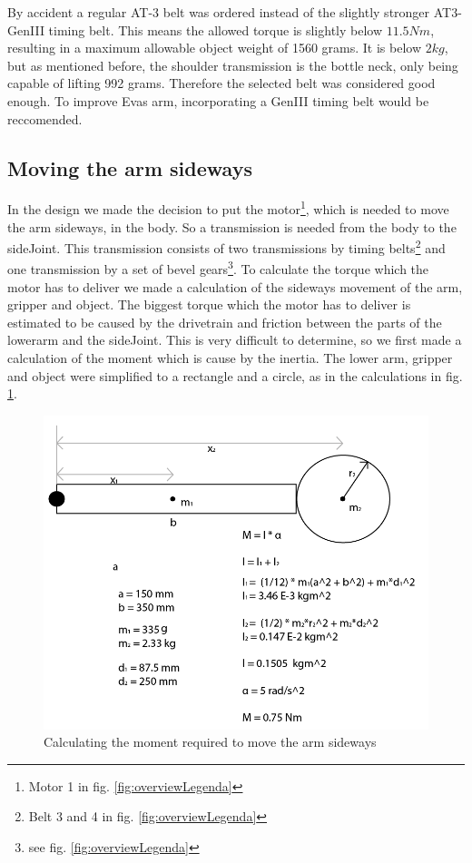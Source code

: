\documentclass[technical_document.tex]{subfiles}
\begin{document}
By accident a regular AT-3 belt was ordered instead of the slightly stronger AT3-GenIII timing belt. This means the allowed torque is slightly below $11.5Nm$, resulting in a maximum allowable object weight  of 1560 grams. It is below $2kg$, but as mentioned before, the shoulder transmission is the bottle neck, only being capable of lifting 992 grams.
Therefore the selected belt was considered good enough. To improve Eva\textquotesingle{}s arm, incorporating a GenIII timing belt would be reccomended.

\subsection{Moving the arm sideways}

In the design we made the decision to put the motor\footnote{Motor 1 in fig. \ref{fig:overviewLegenda}}, which is needed to move the arm sideways, in the body. So a transmission is needed from the body to the sideJoint. This transmission consists of two transmissions by timing belts\footnote{Belt 3 and 4 in fig. \ref{fig:overviewLegenda}} and one transmission by a set of bevel gears\footnote{see fig. \ref{fig:overviewLegenda}}. To calculate the torque which the motor has to deliver we made a calculation of the sideways movement of the arm, gripper and object. The biggest torque which the motor has to deliver is estimated to be caused by the drivetrain and friction between the parts of the lowerarm and the sideJoint. This is very difficult to determine, so we first made a calculation of the moment which is cause by the inertia. The lower arm, gripper and object were simplified to a rectangle and a circle, as in the calculations in fig. \ref{fig:driveTrain_sideJoint}.

\begin{figure}[ht!]
	\centering
	\mbox{\includegraphics[scale=0.5]{Images/driveTrain_sideJoint.png}}
	\caption{Calculating the moment required to move the arm sideways}
	\label{fig:driveTrain_sideJoint}
\end{figure}
\end{document}
